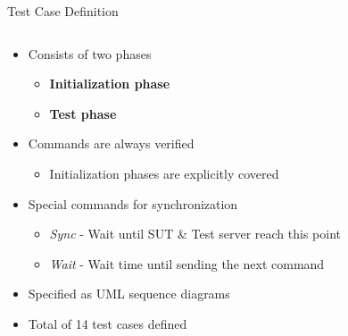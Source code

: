 \documentclass[showdate=true, slidenumbers=slide]{beamerruhuisstijl169}
\begin{document}
\begin{frame}{Test Case Definition}
    \begin{columns}[T,totalwidth=\linewidth]
        \begin{column}{0.6\textwidth}
            \begin{itemize}
                \item Consists of two phases
                \begin{itemize}
                    \item \textbf{Initialization phase}
                    \item \textbf{Test phase}
                \end{itemize}
                \item Commands are always verified
                \begin{itemize}
                    \item Initialization phases are explicitly covered
                \end{itemize}
                \item Special commands for synchronization
                \begin{itemize}
                    \item \textit{Sync} - Wait until SUT \& Test server reach this point
                    \item \textit{Wait} - Wait time until sending the next command
                \end{itemize}
                \item Specified as UML sequence diagrams
                \item Total of 14 test cases defined
            \end{itemize}
        \end{column}
        \begin{column}{0.4\textwidth}

\end{column}
\end{columns}
\end{frame}
\end{document}

